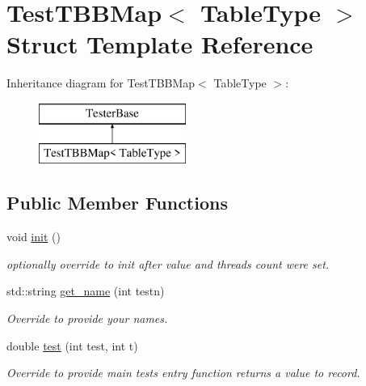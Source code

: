 \hypertarget{structTestTBBMap}{}\section{Test\+T\+B\+B\+Map$<$ Table\+Type $>$ Struct Template Reference}
\label{structTestTBBMap}
Inheritance diagram for Test\+T\+B\+B\+Map$<$ Table\+Type $>$\+:\begin{figure}[H]
\begin{center}
\leavevmode
\includegraphics[height=2.000000cm]{structTestTBBMap}
\end{center}
\end{figure}
\subsection*{Public Member Functions}
\begin{DoxyCompactItemize}
\item 
\hypertarget{structTestTBBMap_a93eea51926587f408f16bd5fec77e632}{}void \hyperlink{structTestTBBMap_a93eea51926587f408f16bd5fec77e632}{init} ()\label{structTestTBBMap_a93eea51926587f408f16bd5fec77e632}

\begin{DoxyCompactList}\small\item\em optionally override to init after value and threads count were set. \end{DoxyCompactList}\item 
\hypertarget{structTestTBBMap_a3303dff69da81d65545a25b24f2f431f}{}std\+::string \hyperlink{structTestTBBMap_a3303dff69da81d65545a25b24f2f431f}{get\+\_\+name} (int testn)\label{structTestTBBMap_a3303dff69da81d65545a25b24f2f431f}

\begin{DoxyCompactList}\small\item\em Override to provide your names. \end{DoxyCompactList}\item 
\hypertarget{structTestTBBMap_abc4d0e080dfb60e1d3131669bd0651f0}{}double \hyperlink{structTestTBBMap_abc4d0e080dfb60e1d3131669bd0651f0}{test} (int test, int t)\label{structTestTBBMap_abc4d0e080dfb60e1d3131669bd0651f0}

\begin{DoxyCompactList}\small\item\em Override to provide main test\textquotesingle{}s entry function returns a value to record. \end{DoxyCompactList}\end{DoxyCompactItemize}

